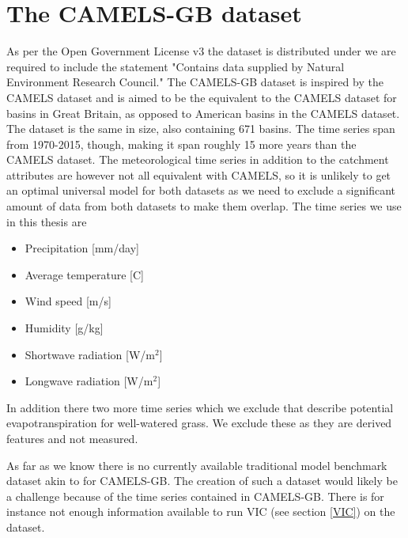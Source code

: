 \section{The CAMELS-GB dataset}
As per the Open Government License v3 the dataset is distributed under we are required 
to include the statement "Contains data supplied by Natural Environment Research Council."
The CAMELS-GB dataset \citep{CAMELS_GB} is inspired by the CAMELS dataset and is 
aimed to be the equivalent to the CAMELS dataset for basins in Great Britain, 
as opposed to American basins in the CAMELS dataset. The dataset is the same in size,
also containing 671 basins. The time series span from 1970-2015, though, making 
it span roughly 15 more years than the CAMELS dataset.
 The meteorological time series in addition to the catchment attributes are however 
 not all equivalent with CAMELS, so it is unlikely to get an optimal universal model 
 for both datasets as we need to exclude a significant amount of data from both 
 datasets to make them overlap.
The time series we use in this thesis are
\begin{itemize}
    \item Precipitation [mm/day]
    \item Average temperature [C\degree]
    \item Wind speed [m/s]
    \item Humidity [g/kg]
    \item Shortwave radiation [W/m$^2$]
    \item Longwave radiation [W/m$^2$]
\end{itemize}
In addition there two more time series which we exclude that describe potential 
evapotranspiration for well-watered grass. We exclude these as they are derived 
features and not measured.


As far as we know there is no currently available traditional model benchmark dataset 
akin to \cite{CAMELS_hydroshare} for CAMELS-GB. The creation of such a dataset would 
likely be a challenge because of the time series contained in CAMELS-GB. There is for 
instance not enough information available to run VIC (see section \ref{VIC}) on 
the dataset.
